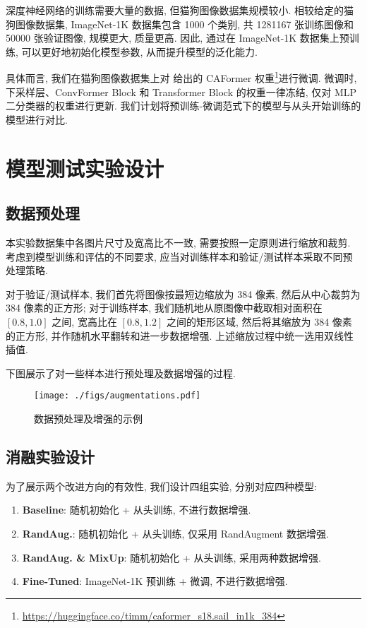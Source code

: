 \documentclass[12pt,a4paper]{article}
\begin{document}
深度神经网络的训练需要大量的数据, 但猫狗图像数据集规模较小. 相较给定的猫狗图像数据集, ImageNet-1K 数据集包含 1000 个类别, 共 1281167 张训练图像和 50000 张验证图像, 规模更大, 质量更高. 因此, 通过在 ImageNet-1K 数据集上预训练, 可以更好地初始化模型参数, 从而提升模型的泛化能力.

具体而言, 我们在猫狗图像数据集上对 \cite{yu_metaformer_2024} 给出的 CAFormer 权重\footnote{\url{https://huggingface.co/timm/caformer_s18.sail_in1k_384}}进行微调. 微调时, 下采样层、ConvFormer Block 和 Transformer Block 的权重一律冻结, 仅对 MLP 二分类器的权重进行更新. 我们计划将预训练-微调范式下的模型与从头开始训练的模型进行对比.

\section{模型测试实验设计}

\subsection{数据预处理}

本实验数据集中各图片尺寸及宽高比不一致, 需要按照一定原则进行缩放和裁剪. 考虑到模型训练和评估的不同要求, 应当对训练样本和验证/测试样本采取不同预处理策略.

对于验证/测试样本, 我们首先将图像按最短边缩放为 384 像素, 然后从中心裁剪为 384 像素的正方形; 对于训练样本, 我们随机地从原图像中截取相对面积在 $[0.8, 1.0]$ 之间, 宽高比在 $[0.8, 1.2]$ 之间的矩形区域, 然后将其缩放为 384 像素的正方形, 并作随机水平翻转和进一步数据增强. 上述缩放过程中统一选用双线性插值.

下图展示了对一些样本进行预处理及数据增强的过程.

\begin{figure}[htbp]
    \centering
    \texttt{[image: ./figs/augmentations.pdf]}
    \caption{数据预处理及增强的示例}
\end{figure}

\subsection{消融实验设计}

为了展示两个改进方向的有效性, 我们设计四组实验, 分别对应四种模型:

\begin{enumerate}[noitemsep,topsep=0pt,parsep=0pt]
    \item \textbf{Baseline}: 随机初始化 + 从头训练, 不进行数据增强.
    \item \textbf{RandAug.}: 随机初始化 + 从头训练, 仅采用 RandAugment 数据增强.
    \item \textbf{RandAug. \& MixUp}: 随机初始化 + 从头训练, 采用两种数据增强.
    \item \textbf{Fine-Tuned}: ImageNet-1K 预训练 + 微调, 不进行数据增强.
\end{enumerate}
\end{document}
